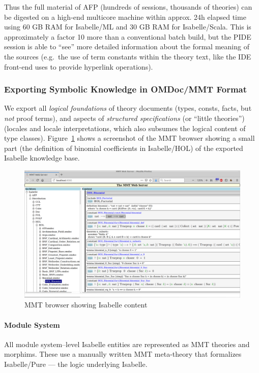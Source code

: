 Thus the full material of AFP (hundreds of sessions, thousands of theories) can be digested on a high-end multicore machine within
approx. 24h elapsed time using 60 GB RAM for Isabelle/ML and 30 GB RAM for Isabelle/Scala.
This is approximately a factor 10 more than a conventional batch build, but the PIDE session is able to ``see'' more detailed information about the formal meaning of the sources (e.g.\ the use of term constants within the theory text, like the IDE front-end uses to provide hyperlink operations).

\subsubsection{Exporting Symbolic Knowledge in OMDoc/MMT Format}

We export all \emph{logical foundations} of theory documents (types, consts, facts, but \emph{not} proof terms), and aspects of \emph{structured specifications} (or ``little theories'') (locales and locale interpretations, which also subsumes the logical content of type classes).
Figure~\ref{fig:isabellemmt} shows a screenshot of the MMT browser showing a small part (the definition of binomial coefficients in Isabelle/HOL) of the exported Isabelle knowledge base.

\begin{figure}[ht]
  \includegraphics[width=\textwidth]{isabelle_mmt}
  \caption{MMT browser showing Isabelle content}\label{fig:isabellemmt}
\end{figure}

\paragraph{Module System}
All module system--level Isabelle entities are represented as MMT theories and morphims.
These use a manually written MMT meta-theory that formalizes Isabelle/Pure --- the logic underlying Isabelle.

